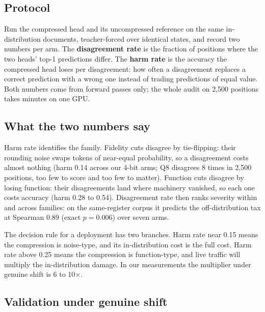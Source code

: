 \documentclass{article}
\newcommand{\x}{$\times$}
\begin{document}
\subsection{Protocol}
\label{sec:audit-protocol}

Run the compressed head and its uncompressed reference on the same in-distribution documents, teacher-forced over identical states, and record two numbers per arm. The \textbf{disagreement rate} is the fraction of positions where the two heads' top-1 predictions differ. The \textbf{harm rate} is the accuracy the compressed head loses per disagreement: how often a disagreement replaces a correct prediction with a wrong one instead of trading predictions of equal value. Both numbers come from forward passes only; the whole audit on 2,500 positions takes minutes on one GPU.

\subsection{What the two numbers say}
\label{sec:audit-numbers}

Harm rate identifies the family. Fidelity cuts disagree by tie-flipping: their rounding noise swaps tokens of near-equal probability, so a disagreement costs almost nothing (harm 0.14 across our 4-bit arms; Q8 disagrees 8 times in 2,500 positions, too few to score and too few to matter). Function cuts disagree by losing function: their disagreements land where machinery vanished, so each one costs accuracy (harm 0.28 to 0.54). Disagreement rate then ranks severity within and across families: on the same-register corpus it predicts the off-distribution tax at Spearman 0.89 (exact $p = 0.006$) over seven arms.

The decision rule for a deployment has two branches. Harm rate near 0.15 means the compression is noise-type, and its in-distribution cost is the full cost. Harm rate above 0.25 means the compression is function-type, and live traffic will multiply the in-distribution damage. In our measurements the multiplier under genuine shift is 6 to 10\x.

\subsection{Validation under genuine shift}
\label{sec:audit-validation}
\end{document}
